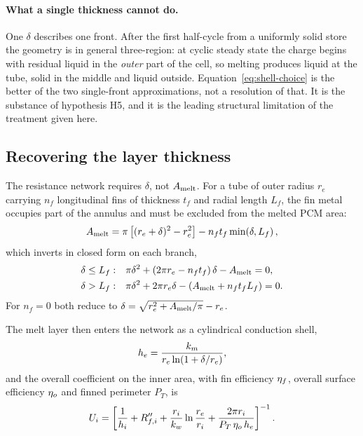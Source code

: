 \paragraph{What a single thickness cannot do.}
One $\delta$ describes one front. After the first half-cycle from a uniformly
solid store the geometry is in general three-region: at cyclic steady state the
charge begins with residual liquid in the \emph{outer} part of the cell, so
melting produces liquid at the tube, solid in the middle and liquid outside.
Equation~\eqref{eq:shell-choice} is the better of the two single-front
approximations, not a resolution of that. It is the substance of hypothesis H5,
and it is the leading structural limitation of the treatment given here.

\subsection{Recovering the layer thickness}

The resistance network requires $\delta$, not $A_{\mathrm{melt}}$. For a tube of outer
radius $r_{e}$ carrying $n_{f}$ longitudinal fins of thickness $t_{f}$ and
radial length $L_{f}$, the fin metal occupies part of the annulus and must be
excluded from the melted PCM area:
\begin{equation}
  A_{\mathrm{melt}} = \pi\left[(r_{e}+\delta)^{2}-r_{e}^{2}\right]
           - n_{f}t_{f}\min\!\left(\delta,L_{f}\right),
  \label{eq:area-fins}
\end{equation}
which inverts in closed form on each branch,
\begin{align}
  \delta \le L_{f}: &\quad
    \pi\delta^{2}+\left(2\pi r_{e}-n_{f}t_{f}\right)\delta-A_{\mathrm{melt}} = 0,
  \label{eq:delta-in}\\
  \delta > L_{f}: &\quad
    \pi\delta^{2}+2\pi r_{e}\delta-\left(A_{\mathrm{melt}}+n_{f}t_{f}L_{f}\right) = 0 .
  \label{eq:delta-out}
\end{align}
For $n_{f}=0$ both reduce to
$\delta=\sqrt{r_{e}^{2}+A_{\mathrm{melt}}/\pi}-r_{e}$.

The melt layer then enters the network as a cylindrical conduction shell,
\begin{equation}
  h_{e} = \frac{k_{m}}{r_{e}\ln\!\left(1+\delta/r_{e}\right)},
  \label{eq:he}
\end{equation}
and the overall coefficient on the inner area, with fin efficiency $\eta_{f}$,
overall surface efficiency $\eta_{o}$ and finned perimeter $P_{T}$, is
\begin{equation}
  U_{i} = \left[\frac{1}{h_{i}} + R''_{f,i}
        + \frac{r_{i}}{k_{w}}\ln\frac{r_{e}}{r_{i}}
        + \frac{2\pi r_{i}}{P_{T}\,\eta_{o}\,h_{e}}\right]^{-1}.
  \label{eq:Ui}
\end{equation}

